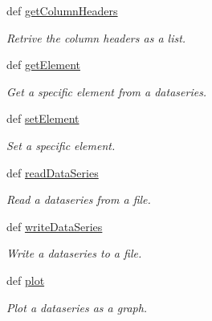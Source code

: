 \begin{DoxyCompactItemize}
\item 
def \hyperlink{classpython_1_1telplugins_1_1_data_series_ace23540a192e59586d4fcf14bb96833f}{get\-Column\-Headers}
\begin{DoxyCompactList}\small\item\em Retrive the column headers as a list. \end{DoxyCompactList}\item 
def \hyperlink{classpython_1_1telplugins_1_1_data_series_a0c2c08ce2d865d58bb8e9661ba55658d}{get\-Element}
\begin{DoxyCompactList}\small\item\em Get a specific element from a dataseries. \end{DoxyCompactList}\item 
def \hyperlink{classpython_1_1telplugins_1_1_data_series_a9886e132dcfc46c715201247b0c1bc7e}{set\-Element}
\begin{DoxyCompactList}\small\item\em Set a specific element. \end{DoxyCompactList}\item 
def \hyperlink{classpython_1_1telplugins_1_1_data_series_a65b2933d24a5ffb2aa123baae6364cf2}{read\-Data\-Series}
\begin{DoxyCompactList}\small\item\em Read a dataseries from a file. \end{DoxyCompactList}\item 
def \hyperlink{classpython_1_1telplugins_1_1_data_series_a79c406248945414b6b7d78556d6cb00d}{write\-Data\-Series}
\begin{DoxyCompactList}\small\item\em Write a dataseries to a file. \end{DoxyCompactList}\item 
def \hyperlink{classpython_1_1telplugins_1_1_data_series_aeb8e4daabd433513f8261dcd2e788c74}{plot}
\begin{DoxyCompactList}\small\item\em Plot a dataseries as a graph. \end{DoxyCompactList}\end{DoxyCompactItemize}
